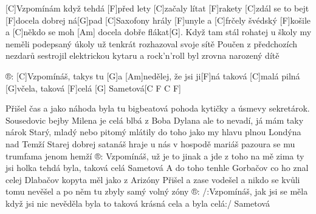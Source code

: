 
[C]Vzpomínám když tehdá [F]před lety [C]začaly lítat [F]rakety  
[C]zdál se to bejt [F]docela dobrej ná[G]pad
[C]Saxofony hrály [F]unyle a [C]frčely švédský [F]košile
a [C]někdo se moh [Am] docela dobře flákat[G]. 
Když tam stál rohatej u školy my neměli podepsaný úkoly
už tenkrát rozhazoval svoje sítě
Poučen z předchozích nezdarů sestrojil elektrickou kytaru
a rock'n'roll byl zrovna narozený dítě

®: [C]Vzpomínáš, takys tu [G] a [Am]nedělej, že jsi ji[F]ná
taková [C]malá pilná [G]včela, 
taková [F]celá [G] Sametová[C F C F]

Přišel čas a jako náhoda byla tu bigbeatová pohoda
kytičky a úsmevy sekretárok.
Sousedovic bejby Milena je celá blbá z Boba Dylana
ale to nevadí, já mám taky nárok
Starý, mladý nebo pitomý mlátily do toho jako my
hlavu plnou Londýna nad Temží
Starej dobrej satanáš hraje u nás v hospodě mariáš
pazoura se mu trumfama jenom hemží
®: Vzpomínáš, už je to jinak a jde z toho na mě zima
ty jsi holka tehdá byla, taková celá Sametová
A do toho tenhle Gorbačov co ho znal celej Dlabačov
kopyta měl jako z Arizóny
Přišel a zase vodešel a nikdo se kvůli tomu nevěšel
a po něm tu zbyly samý volný zóny
®: /:Vzpomínáš, jak jsi se měla když jsi nic nevěděla
byla to taková krásná cela a byla celá:/  Sametová